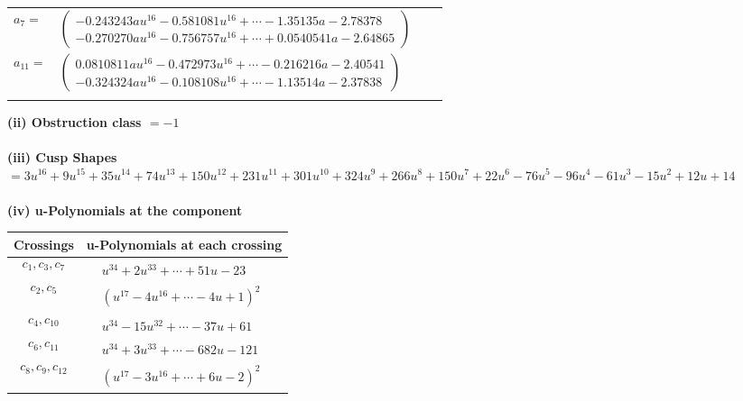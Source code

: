\documentclass[1p]{elsarticle_modified}
\theoremstyle{definition}
\begin{document}
\begin{tabular}{m{7pt} m{180pt} m{7pt} m{180pt} }
\flushright $a_{7}=$&$\begin{pmatrix}-0.243243 a u^{16}-0.581081 u^{16}+\cdots-1.35135 a-2.78378\\-0.270270 a u^{16}-0.756757 u^{16}+\cdots+0.0540541 a-2.64865\end{pmatrix}$ \\
\flushright $a_{11}=$&$\begin{pmatrix}0.0810811 a u^{16}-0.472973 u^{16}+\cdots-0.216216 a-2.40541\\-0.324324 a u^{16}-0.108108 u^{16}+\cdots-1.13514 a-2.37838\end{pmatrix}$\\&\end{tabular}
\flushleft \textbf{(ii) Obstruction class $= -1$}\\~\\
\flushleft \textbf{(iii) Cusp Shapes $= 3 u^{16}+9 u^{15}+35 u^{14}+74 u^{13}+150 u^{12}+231 u^{11}+301 u^{10}+324 u^9+266 u^8+150 u^7+22 u^6-76 u^5-96 u^4-61 u^3-15 u^2+12 u+14$}\\~\\
\newpage\renewcommand{\arraystretch}{1}
\flushleft \textbf{(iv) u-Polynomials at the component}\newline \\
\begin{tabular}{m{50pt}|m{274pt}}
Crossings & \hspace{64pt}u-Polynomials at each crossing \\
\hline $$\begin{aligned}c_{1},c_{3},c_{7}\end{aligned}$$&$\begin{aligned}
&u^{34}+2 u^{33}+\cdots+51 u-23
\end{aligned}$\\
\hline $$\begin{aligned}c_{2},c_{5}\end{aligned}$$&$\begin{aligned}
&(u^{17}-4 u^{16}+\cdots-4 u+1)^{2}
\end{aligned}$\\
\hline $$\begin{aligned}c_{4},c_{10}\end{aligned}$$&$\begin{aligned}
&u^{34}-15 u^{32}+\cdots-37 u+61
\end{aligned}$\\
\hline $$\begin{aligned}c_{6},c_{11}\end{aligned}$$&$\begin{aligned}
&u^{34}+3 u^{33}+\cdots-682 u-121
\end{aligned}$\\
\hline $$\begin{aligned}c_{8},c_{9},c_{12}\end{aligned}$$&$\begin{aligned}
&(u^{17}-3 u^{16}+\cdots+6 u-2)^{2}
\end{aligned}$\\
\hline
\end{tabular}\\~\\
\end{document}

